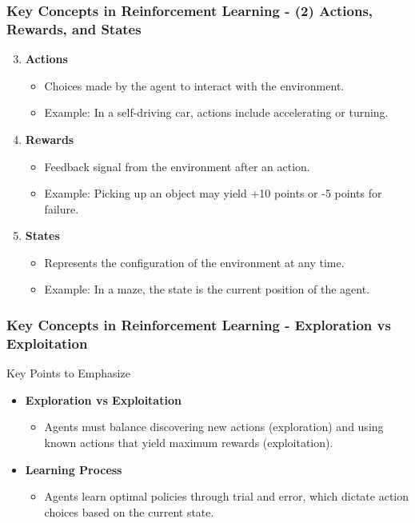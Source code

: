 \documentclass[aspectratio=169]{beamer}
\begin{document}
\begin{frame}[fragile]
    \frametitle{Key Concepts in Reinforcement Learning - (2) Actions, Rewards, and States}
    \begin{enumerate}
        \setcounter{enumi}{2}
        \item \textbf{Actions}
        \begin{itemize}
            \item Choices made by the agent to interact with the environment.
            \item Example: In a self-driving car, actions include accelerating or turning.
        \end{itemize}
        
        \item \textbf{Rewards}
        \begin{itemize}
            \item Feedback signal from the environment after an action.
            \item Example: Picking up an object may yield +10 points or -5 points for failure.
        \end{itemize}
        
        \item \textbf{States}
        \begin{itemize}
            \item Represents the configuration of the environment at any time.
            \item Example: In a maze, the state is the current position of the agent.
        \end{itemize}
    \end{enumerate}
\end{frame}

\begin{frame}[fragile]
    \frametitle{Key Concepts in Reinforcement Learning - Exploration vs Exploitation}
    \begin{block}{Key Points to Emphasize}
        \begin{itemize}
            \item \textbf{Exploration vs Exploitation}
            \begin{itemize}
                \item Agents must balance discovering new actions (exploration) and using known actions that yield maximum rewards (exploitation).
            \end{itemize}
            \item \textbf{Learning Process}
            \begin{itemize}
                \item Agents learn optimal policies through trial and error, which dictate action choices based on the current state.
            \end{itemize}
        \end{itemize}
    \end{block}
\end{frame}
\end{document}
